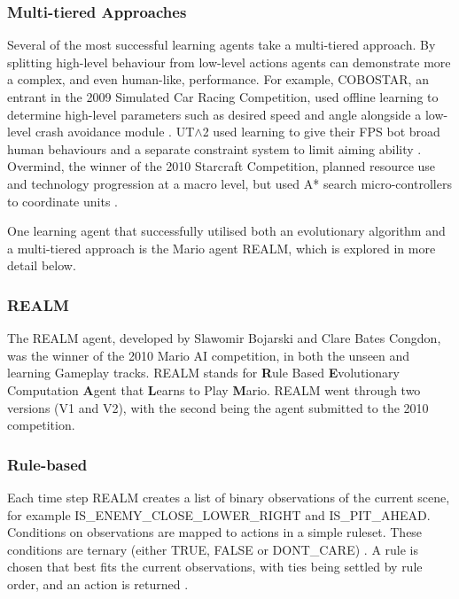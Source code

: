 \subsubsection{Multi-tiered Approaches}

Several of the most successful learning agents take a multi-tiered approach. By splitting high-level behaviour from low-level actions agents can demonstrate more a complex, and even human-like, performance. For example, COBOSTAR, an entrant in the 2009 Simulated Car Racing Competition, used offline learning to determine high-level parameters such as desired speed and angle alongside a low-level crash avoidance module \cite[p.~136]{scrc}. UT$\wedge$2 used learning to give their FPS bot broad human behaviours and a separate constraint system to limit aiming ability \cite{2kbot}.  Overmind, the winner of the 2010 Starcraft Competition, planned resource use and technology progression at a macro level, but used A* search micro-controllers to coordinate units \cite{overmind}. 

\vspace{\baselineskip} \noindent
One learning agent that successfully utilised both an evolutionary algorithm and a multi-tiered approach is the Mario agent REALM, which is explored in more detail below. 

\subsubsection{REALM}
\label{ssec:realm}

The REALM agent, developed by Slawomir Bojarski and Clare Bates Congdon, was the winner of the 2010 Mario AI competition, in both the unseen and learning Gameplay tracks. REALM stands for \textbf{R}ule Based \textbf{E}volutionary Computation \textbf{A}gent that \textbf{L}earns to Play \textbf{M}ario. REALM went through two versions (V1 and V2), with the second being the agent submitted to the 2010 competition.

\subsubsection*{\hspace{6pt}Rule-based}

Each time step REALM creates a list of binary observations of the current scene, for example {\footnotesize IS\_ENEMY\_CLOSE\_LOWER\_RIGHT} and {\footnotesize IS\_PIT\_AHEAD}. Conditions on observations are mapped to actions in a simple ruleset. These conditions are ternary (either {\footnotesize TRUE}, {\footnotesize FALSE} or {\footnotesize DONT\_CARE}) \cite[p.~85]{realm}. A rule is chosen that best fits the current observations, with ties being settled by rule order, and an action is returned \cite[p.~86]{realm}.


